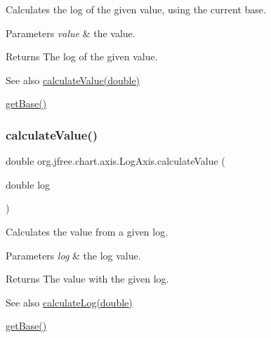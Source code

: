 Calculates the log of the given value, using the current base.


\begin{DoxyParams}{Parameters}
{\em value} & the value.\\
\hline
\end{DoxyParams}
\begin{DoxyReturn}{Returns}
The log of the given value.
\end{DoxyReturn}
\begin{DoxySeeAlso}{See also}
\mbox{\hyperlink{classorg_1_1jfree_1_1chart_1_1axis_1_1_log_axis_a9b846dad36da8c9775e3c1016d6f08aa}{calculate\+Value(double)}} 

\mbox{\hyperlink{classorg_1_1jfree_1_1chart_1_1axis_1_1_log_axis_a9d9a84aece9132cbd9620a6aff9d6aef}{get\+Base()}} 
\end{DoxySeeAlso}
\mbox{\label{classorg_1_1jfree_1_1chart_1_1axis_1_1_log_axis_a9b846dad36da8c9775e3c1016d6f08aa}} 
\subsubsection{\texorpdfstring{calculate\+Value()}{calculateValue()}}
{\footnotesize\ttfamily double org.\+jfree.\+chart.\+axis.\+Log\+Axis.\+calculate\+Value (\begin{DoxyParamCaption}\item[{double}]{log }\end{DoxyParamCaption})}

Calculates the value from a given log.


\begin{DoxyParams}{Parameters}
{\em log} & the log value.\\
\hline
\end{DoxyParams}
\begin{DoxyReturn}{Returns}
The value with the given log.
\end{DoxyReturn}
\begin{DoxySeeAlso}{See also}
\mbox{\hyperlink{classorg_1_1jfree_1_1chart_1_1axis_1_1_log_axis_ad0dbcac62b133e033ce54a998eab3bd5}{calculate\+Log(double)}} 

\mbox{\hyperlink{classorg_1_1jfree_1_1chart_1_1axis_1_1_log_axis_a9d9a84aece9132cbd9620a6aff9d6aef}{get\+Base()}} 
\end{DoxySeeAlso}
\mbox{\label{classorg_1_1jfree_1_1chart_1_1axis_1_1_log_axis_a445d544d4281258edb33bd61c9f70913}} 
